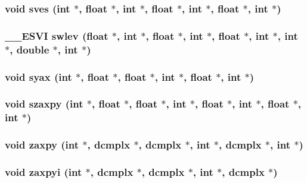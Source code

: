 \subsubsection{\setlength{\rightskip}{0pt plus 5cm}void sves (int $\ast$, float $\ast$, int $\ast$, float $\ast$, int $\ast$, float $\ast$, int $\ast$)}\label{essl_8h_d7309c286e51a94ae5dfefa7f52fe71a}


\subsubsection{\setlength{\rightskip}{0pt plus 5cm}\_\-\_\-ESVI swlev (float $\ast$, int $\ast$, float $\ast$, int $\ast$, float $\ast$, int $\ast$, int $\ast$, double $\ast$, int $\ast$)}\label{essl_8h_e14430bcf93574d60c3a09c628744f05}


\subsubsection{\setlength{\rightskip}{0pt plus 5cm}void syax (int $\ast$, float $\ast$, float $\ast$, int $\ast$, float $\ast$, int $\ast$)}\label{essl_8h_4758c116e2fbf3fa47c8516ebc731420}


\subsubsection{\setlength{\rightskip}{0pt plus 5cm}void szaxpy (int $\ast$, float $\ast$, float $\ast$, int $\ast$, float $\ast$, int $\ast$, float $\ast$, int $\ast$)}\label{essl_8h_68e41ed46dc7590cfaa3d778a020de77}


\subsubsection{\setlength{\rightskip}{0pt plus 5cm}void zaxpy (int $\ast$, {\bf dcmplx} $\ast$, {\bf dcmplx} $\ast$, int $\ast$, {\bf dcmplx} $\ast$, int $\ast$)}\label{essl_8h_3b5af196d064bdef907089c5ac6afe78}


\subsubsection{\setlength{\rightskip}{0pt plus 5cm}void zaxpyi (int $\ast$, {\bf dcmplx} $\ast$, {\bf dcmplx} $\ast$, int $\ast$, {\bf dcmplx} $\ast$)}\label{essl_8h_98475ae5bfe9aaa649bf429a50fe08ca}


